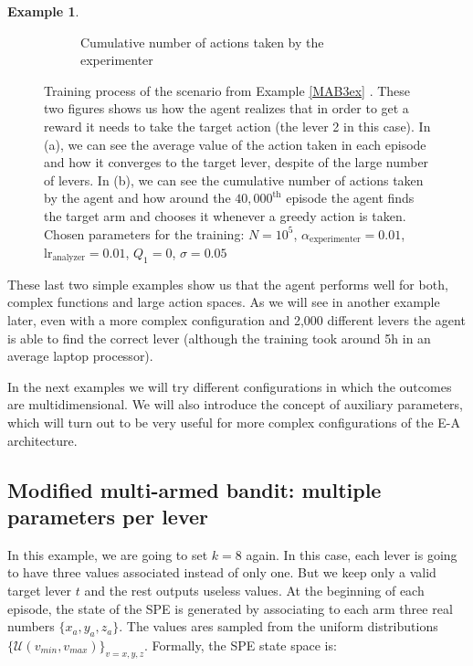 \documentclass[11pt,a4paper,twoside]{report}
\newcommand{\+}{\textnormal{+} }
\theoremstyle{definition}
\newtheorem{myex}[mythm]{Example}
\numberwithin{equation}{chapter}
\begin{document}
\begin{myex}
\begin{figure}[]
\begin{subfigure}{.5\textwidth}
        \caption{Cumulative number of actions taken by the experimenter}
        \label{fig:actionsMAB3}
      \end{subfigure}
      \caption{Training process of the scenario from Example \ref{MAB3ex} . These two figures shows us how
      the agent realizes that in order to get a reward it needs to take the target
      action (the lever 2 in this case). In (a), we can see the average value of
      the action taken in each episode and how it converges to the target lever,
      despite of the large number of levers. In (b), we can see the cumulative
      number of actions taken by the agent and how around the $40,000^\text{th}$
      episode the agent finds the target arm and chooses it whenever a greedy
      action is taken. Chosen parameters for the training: $N=10^5$, $\alpha_\text{experimenter}=0.01$,
      $\text{lr}_\text{analyzer}=0.01$, $Q_1=0$, $\sigma=0.05$}
    \end{figure}
  \end{myex}

  These last two simple examples show us that the agent performs well for both,
  complex functions and large action spaces. As we will see in another example later, even with a more
  complex configuration and 2,000 different levers the agent is able to find the
  correct lever (although the training took around 5h in an average laptop
  processor).

  \par In the next examples we will try different configurations in which the
  outcomes are multidimensional. We will also introduce the concept of auxiliary
  parameters, which will turn out to be very useful for more complex
  configurations of the E-A architecture.

  \subsection{Modified multi-armed bandit: multiple parameters per lever}
    In this example, we are going to set $k=8$ again. In this case, each
    lever is going to have three values associated instead of only one. But 
    we keep only a valid target lever $t$ and the rest outputs useless
    values. At the beginning of each episode, the
    state of the SPE is generated by associating to each arm three real numbers
     $\{x_a,y_a,z_a\}$. The values ares sampled from the uniform distributions
    $\{\mathcal{U}(v_{min},v_{max})\}_{v=x,y,z}$. Formally, the SPE state space 
    is:
    
\end{document}
